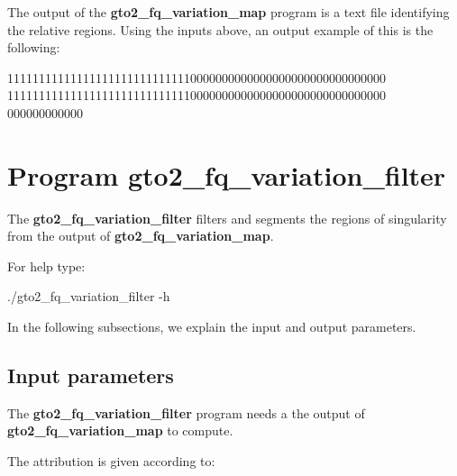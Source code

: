 \documentclass[11pt,]{krantz}
\newenvironment{Shaded}{\begin{snugshade}}{\end{snugshade}}
\newcommand{\ExtensionTok}[1]{#1}
\newcommand{\NormalTok}[1]{#1}
\begin{document}
The output of the \textbf{gto2\_fq\_variation\_map} program is a text
file identifying the relative regions. Using the inputs above, an output
example of this is the following:

\begin{Shaded}
\begin{Highlighting}[]
\ExtensionTok{111111111111111111111111111110000000000000000000000000000000}
\ExtensionTok{111111111111111111111111111110000000000000000000000000000000}
\ExtensionTok{000000000000}
\end{Highlighting}
\end{Shaded}

\section{Program
gto2\_fq\_variation\_filter}\label{program-gto2_fq_variation_filter}

The \textbf{gto2\_fq\_variation\_filter} filters and segments the
regions of singularity from the output of
\textbf{gto2\_fq\_variation\_map}.

For help type:

\begin{Shaded}
\begin{Highlighting}[]
\ExtensionTok{./gto2_fq_variation_filter}\NormalTok{ -h}
\end{Highlighting}
\end{Shaded}

In the following subsections, we explain the input and output
parameters.

\subsection*{Input parameters}\label{input-parameters-24}


The \textbf{gto2\_fq\_variation\_filter} program needs a the output of
\textbf{gto2\_fq\_variation\_map} to compute.

The attribution is given according to:
\end{document}
